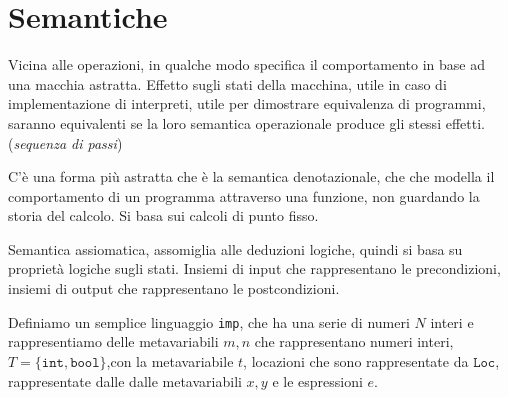 \chapter{Semantiche}
Vicina alle operazioni, in qualche modo specifica il comportamento in base 
ad una macchia astratta. Effetto sugli stati della macchina, utile 
in caso di implementazione di interpreti, utile per dimostrare 
equivalenza di programmi, saranno equivalenti se la loro semantica 
operazionale produce gli stessi effetti. (\textit{sequenza di passi})

C'è una forma più astratta che è la semantica denotazionale, che
che modella il comportamento di un programma attraverso una funzione, 
non guardando la storia del calcolo. Si basa sui calcoli di punto fisso.

Semantica assiomatica, assomiglia alle deduzioni logiche, 
quindi si basa su proprietà logiche sugli stati.
Insiemi di input che rappresentano le precondizioni,
insiemi di output che rappresentano le postcondizioni.

Definiamo un semplice linguaggio \texttt{imp}, che ha una serie di numeri 
$N$ interi e rappresentiamo delle metavariabili $m,n$ che rappresentano
numeri interi, $T=\{\texttt{int}, \texttt{bool}\}$,con la metavariabile $t$, 
locazioni che sono rappresentate da $\texttt{Loc}$, rappresentate dalle
dalle metavariabili $x,y$
e le espressioni $e$.